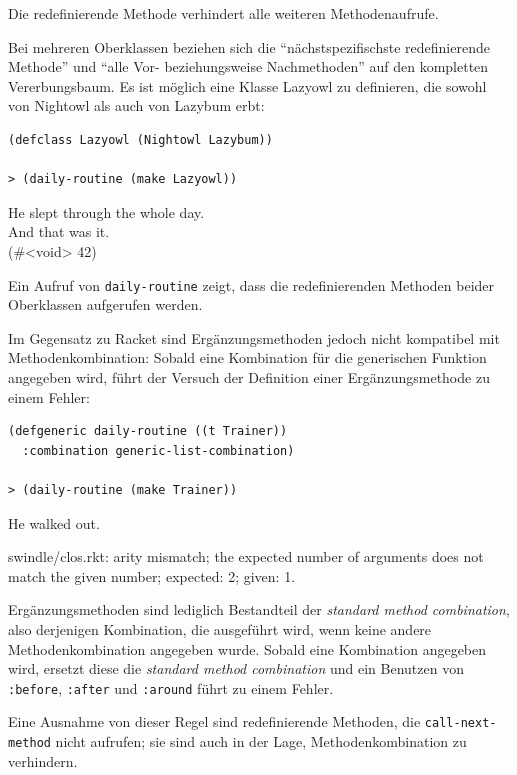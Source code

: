 Die redefinierende Methode verhindert alle weiteren Methodenaufrufe. 

Bei mehreren Oberklassen beziehen sich die ``nächstspezifischste redefinierende Methode'' und ``alle Vor- beziehungsweise Nachmethoden'' auf den kompletten Vererbungsbaum. Es ist möglich eine Klasse Lazyowl zu definieren, die sowohl von Nightowl als auch von Lazybum erbt:

\begin{lstlisting}
(defclass Lazyowl (Nightowl Lazybum))

> (daily-routine (make Lazyowl))
\end{lstlisting}
{\routput He slept through the whole day.\\
\phantom{.}And that was it.\\
\phantom{.}(\#<void> 42)}

Ein Aufruf von \texttt{daily-routine} zeigt, dass die redefinierenden Methoden beider Oberklassen aufgerufen werden. 

Im Gegensatz zu Racket sind Ergänzungsmethoden jedoch nicht kompatibel mit Methodenkombination: Sobald eine Kombination für die generischen Funktion angegeben wird, führt der Versuch der Definition einer Ergänzungsmethode zu einem Fehler:

\begin{lstlisting}
(defgeneric daily-routine ((t Trainer))
  :combination generic-list-combination)
  
> (daily-routine (make Trainer))
\end{lstlisting}
{\routput He walked out.}

\vspace{-0.3cm}
{\rerror swindle/clos.rkt: arity mismatch; the expected number of arguments does not match the given number; expected: 2; given: 1.}

Ergänzungsmethoden sind lediglich Bestandteil der \emph{standard method combination}, also derjenigen Kombination, die ausgeführt wird, wenn keine andere Methodenkombination angegeben wurde. Sobald eine Kombination angegeben wird, ersetzt diese die \textit{standard method combination} und ein Benutzen von \texttt{:before}, \texttt{:after} und \texttt{:around} führt zu einem Fehler.

Eine Ausnahme von dieser Regel sind redefinierende Methoden, die \texttt{call-next-method} nicht aufrufen; sie sind auch in der Lage, Methodenkombination zu verhindern.

